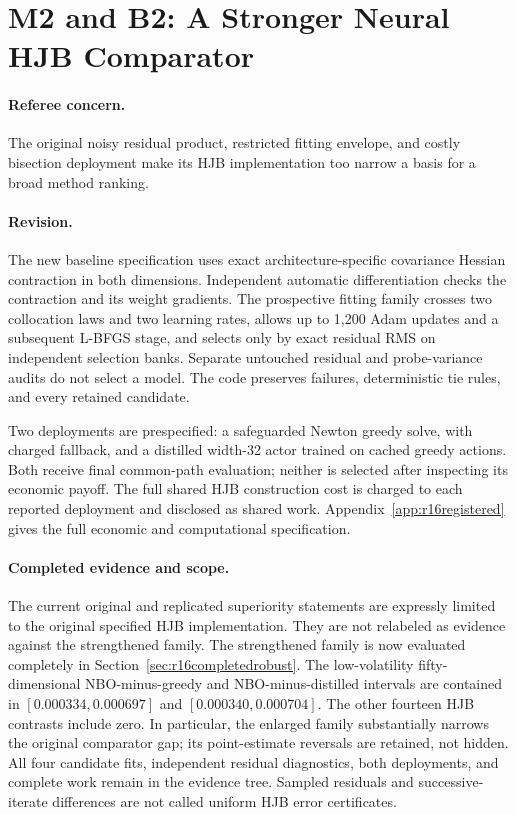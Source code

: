 \section{M2 and B2: A Stronger Neural HJB Comparator}
\paragraph*{Referee concern.} The original noisy residual product, restricted fitting envelope, and costly bisection deployment make its HJB implementation too narrow a basis for a broad method ranking.

\paragraph*{Revision.} The new baseline specification uses exact architecture-specific covariance Hessian contraction in both dimensions. Independent automatic differentiation checks the contraction and its weight gradients. The prospective fitting family crosses two collocation laws and two learning rates, allows up to 1,200 Adam updates and a subsequent L-BFGS stage, and selects only by exact residual RMS on independent selection banks. Separate untouched residual and probe-variance audits do not select a model. The code preserves failures, deterministic tie rules, and every retained candidate.

Two deployments are prespecified: a safeguarded Newton greedy solve, with charged fallback, and a distilled width-32 actor trained on cached greedy actions. Both receive final common-path evaluation; neither is selected after inspecting its economic payoff. The full shared HJB construction cost is charged to each reported deployment and disclosed as shared work. Appendix~\ref{app:r16registered} gives the full economic and computational specification.

\paragraph*{Completed evidence and scope.} The current original and replicated superiority statements are expressly limited to the original specified HJB implementation. They are not relabeled as evidence against the strengthened family. The strengthened family is now evaluated completely in Section~\ref{sec:r16completedrobust}. The low-volatility fifty-dimensional NBO-minus-greedy and NBO-minus-distilled intervals are contained in $[0.000334,0.000697]$ and $[0.000340,0.000704]$. The other fourteen HJB contrasts include zero. In particular, the enlarged family substantially narrows the original comparator gap; its point-estimate reversals are retained, not hidden. All four candidate fits, independent residual diagnostics, both deployments, and complete work remain in the evidence tree. Sampled residuals and successive-iterate differences are not called uniform HJB error certificates.

